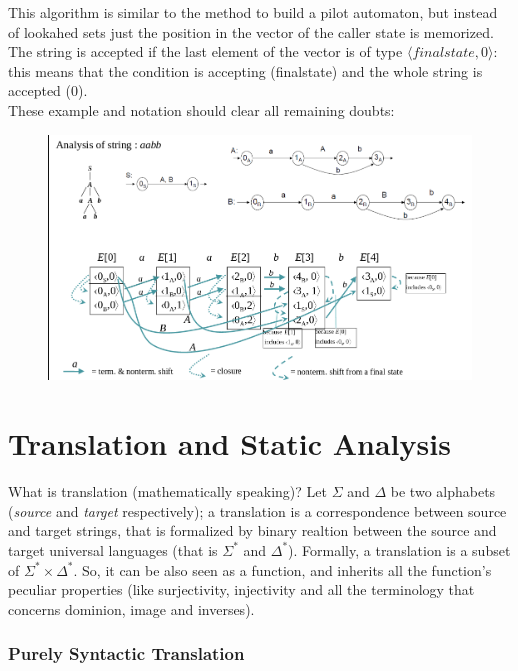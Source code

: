 \documentclass[10pt,a4paper]{article}
\begin{document}
 				This algorithm is similar to the method to build a pilot automaton, but instead of lookahed sets just the position in the vector of the caller state is memorized. The string is accepted if the last element of the vector is of type $\langle finalstate, 0 \rangle$: this means that the condition is accepting (finalstate) and the whole string is accepted (0).\\
 				These example and notation should clear all remaining doubts:
 				\begin{figure}[H]
 					\centering
 					\includegraphics[width = \textwidth]{./images/exEarley.png}
 				\end{figure}
	
	\clearpage
	\part{Translation and Static Analysis}
		What is translation (mathematically speaking)? Let $\Sigma$ and $\Delta$ be two alphabets (\emph{source} and \emph{target} respectively); a translation is a correspondence between source and target strings, that is formalized by binary realtion between the source and target universal languages (that is $\Sigma^\ast$ and $\Delta^\ast$). Formally, a translation is a subset of $\Sigma^\ast \times \Delta^\ast$. So, it can be also seen as a function, and inherits all the function's peculiar properties (like surjectivity, injectivity and all the terminology that concerns dominion, image and inverses).
		
		\section{Purely Syntactic Translation}
\end{document}
